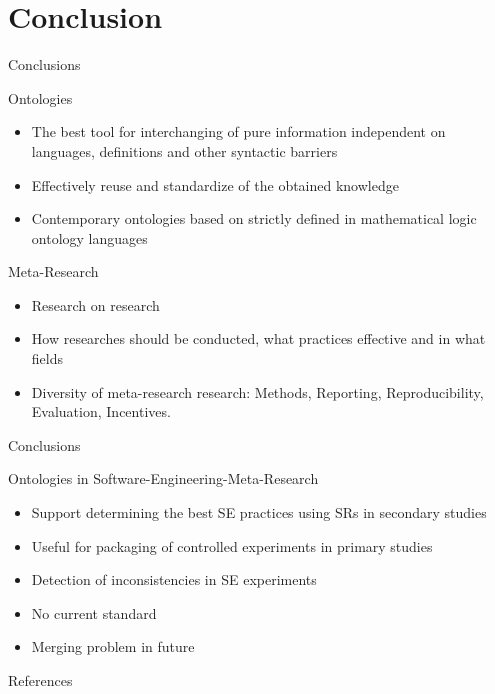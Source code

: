 \documentclass[16:9,en,navbarside]{sdqbeamer}
\begin{document}
\section{Conclusion}
\begin{frame}{Conclusions}
\pause
\begin{block}{Ontologies}
    \begin{itemize}
        \item<2-> The best tool for interchanging of pure information independent on languages, definitions and other syntactic barriers 
        \item<3-> Effectively reuse and standardize of the obtained knowledge
        \item<4-> Contemporary ontologies based on strictly defined in mathematical logic ontology languages 
    \end{itemize}
\end{block}
\pause
\begin{block}{Meta-Research}  
    \begin{itemize}
		\item<5-> Research on research
		\item<6-> How researches should be conducted, what practices effective and in what fields
		\item<7-> Diversity of meta-research research: Methods, Reporting, Reproducibility, Evaluation, Incentives.
	\end{itemize}
\end{block}
\end{frame}
\begin{frame}{Conclusions}
\begin{block}{Ontologies in Software-Engineering-Meta-Research}
    \begin{itemize}
        \item<1-> Support determining the best SE practices using SRs in secondary studies 
        \item<2-> Useful for packaging of controlled experiments in primary studies
        \item<3-> Detection of inconsistencies in SE experiments
        \item<4-> No current standard
        \item<5-> Merging problem in future 
    \end{itemize}
\end{block}
\end{frame}

\appendix
\beginbackup

\begin{frame}[allowframebreaks]{References}
\printbibliography
\end{frame}

\backupend
\end{document}
